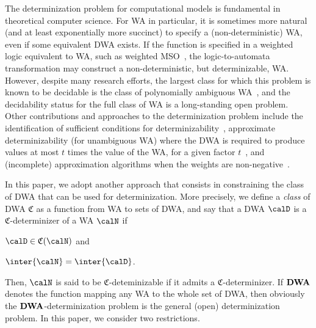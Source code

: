 The determinization problem for computational models is
fundamental in theoretical computer science. For WA in particular, it
is sometimes more natural (and at least exponentially more succinct)
to specify a (non-deterministic) WA, even if some equivalent DWA
exists. If the function is specified in a weighted logic equivalent to
WA, such as weighted MSO~\cite{journals/tcs/DrosteG07}, the
logic-to-automata transformation may construct a non-deterministic,
but determinizable, WA. However, despite many research efforts, the largest class
for which this problem is known to be decidable is the class of
polynomially ambiguous WA~\cite{kirsten_et_al:LIPIcs:2009:1850}, and
the decidability status for the full class of WA is a long-standing
open problem. Other contributions and approaches to the determinization problem
include the identification of sufficient conditions for
determinizability~\cite{Mohri_FiniteState_CoLing}, approximate determinizability
(for unambiguous WA) where the DWA is required to produce values %
at most $t$ times the value of the WA, for a given factor
$t$~\cite{journals/tcs/AminofKL13}, and (incomplete) approximation algorithms
when the weights are non-negative~\cite{journals/mst/ColcombetD16}.

 In this paper, we adopt
another approach that consists in constraining the class of DWA that can be
used for determinization. More precisely, we define a \emph{class} of
DWA $\mathfrak{C}$ as a function from WA to sets of DWA, and
say that a DWA $\calD$ is a $\mathfrak{C}$-determinizer of a WA $\calN$ if
\begin{inparaenum}[$(i)$]
\item $\calD \in \mathfrak{C}(\calN)$ and
\item $\inter{\calN} =
\inter{\calD}$.
\end{inparaenum}
Then, $\calN$ is said to be $\mathfrak{C}$-deteminizable if it admits a
${\mathfrak{C}}$-determinizer. If ${\bf DWA}$ denotes the function mapping any
WA to the whole set of DWA, then obviously the ${\bf DWA}$-determinization
problem is the general (open) determinization problem. In this paper, we consider
two restrictions. 

